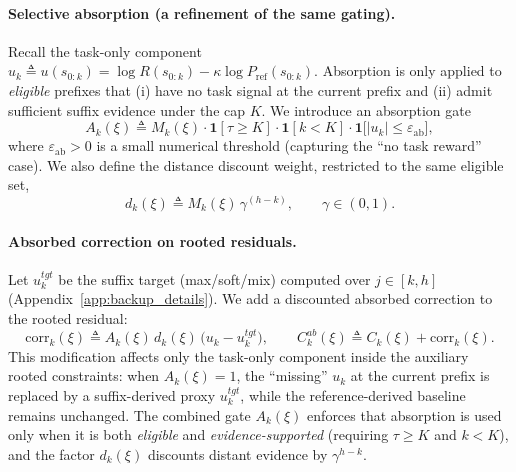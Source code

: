 \documentclass{article}
\theoremstyle{plain}
\theoremstyle{definition}
\theoremstyle{remark}
\begin{document}
\paragraph{Selective absorption (a refinement of the same gating).}
Recall the task-only component $u_k \triangleq u(s_{0:k})=\log R(s_{0:k})-\kappa\log P_{\mathrm{ref}}(s_{0:k})$.
Absorption is only applied to \emph{eligible} prefixes that (i) have no task signal at the current prefix and
(ii) admit sufficient suffix evidence under the cap $K$.
We introduce an absorption gate
\begin{equation}
\label{eq:app_absorb_gate_fix}
A_k(\xi)
\triangleq
M_k(\xi)\cdot \mathbf{1}[\tau\ge K]\cdot \mathbf{1}[k<K]\cdot \mathbf{1}\big[|u_k|\le \varepsilon_{\mathrm{ab}}\big],
\end{equation}
where $\varepsilon_{\mathrm{ab}}>0$ is a small numerical threshold (capturing the ``no task reward'' case).
We also define the distance discount weight, restricted to the same eligible set,
\begin{equation}
\label{eq:app_discount_fix}
d_k(\xi)
\triangleq
M_k(\xi)\,\gamma^{(h-k)},
\qquad \gamma\in(0,1).
\end{equation}

\paragraph{Absorbed correction on rooted residuals.}
Let $u_k^{tgt}$ be the suffix target (max/soft/mix) computed over $j\in[k,h]$ (Appendix~\ref{app:backup_details}).
We add a discounted absorbed correction to the rooted residual:
\begin{equation}
\label{eq:app_corr_fix}
\mathrm{corr}_k(\xi)
\triangleq
A_k(\xi)\,d_k(\xi)\,\big(u_k-u_k^{tgt}\big),
\qquad
C_k^{ab}(\xi)\triangleq C_k(\xi)+\mathrm{corr}_k(\xi).
\end{equation}
This modification affects only the task-only component inside the auxiliary rooted constraints:
when $A_k(\xi)=1$, the ``missing'' $u_k$ at the current prefix is replaced by a suffix-derived proxy $u_k^{tgt}$,
while the reference-derived baseline remains unchanged. The combined gate $A_k(\xi)$ enforces that absorption is used
only when it is both \emph{eligible} and \emph{evidence-supported} (requiring $\tau\ge K$ and $k<K$), and the factor
$d_k(\xi)$ discounts distant evidence by $\gamma^{h-k}$.
\end{document}
